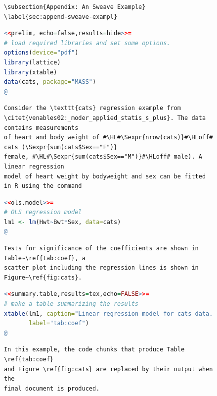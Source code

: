 \documentclass[11pt,article,oneside]{memoir}
\begin{document}
\begin{figure}
\begin{lstlisting}[style=sweave-top]

\end{lstlisting} 
\begin{lstlisting}[language={[latex]tex},numbers=none,style=sweave-tex]   
\subsection{Appendix: An Sweave Example}
\label{sec:append-sweave-exampl}
\end{lstlisting}
\begin{lstlisting}[language=R,numbers=none,style=sweave-r] 
<<prelim, echo=false,results=hide>>=
# load required libraries and set some options.
options(device="pdf")
library(lattice)
library(xtable)
data(cats, package="MASS")
@ 
\end{lstlisting}
\begin{lstlisting}[language={[latex]tex},numbers=none,style=sweave-tex] 
Consider the \texttt{cats} regression example from 
\citet{venables02:_moder_applied_statis_s_plus}. The data contains measurements 
of heart and body weight of #\HL#\Sexpr{nrow(cats)}#\HLoff# cats (\Sexpr{sum(cats$Sex=="F")}
female, #\HL#\Sexpr{sum(cats$Sex=="M")}#\HLoff# male). A linear regression
model of heart weight by bodyweight and sex can be fitted in R using the command
\end{lstlisting} 
\begin{lstlisting}[language=R,numbers=none,style=sweave-r] 
<<ols.model>>=
# OLS regression model 
lm1 <- lm(Hwt~Bwt*Sex, data=cats)
@ 
\end{lstlisting}
\begin{lstlisting}[language={[latex]tex},numbers=none,style=sweave-tex] 
Tests for significance of the coefficients are shown in Table~\ref{tab:coef}, a 
scatter plot including the regression lines is shown in Figure~\ref{fig:cats}.
\end{lstlisting}

\begin{lstlisting}[language=R,numbers=none,style=sweave-r] 
<<summary.table,results=tex,echo=FALSE>>=
# make a table summarizing the results
xtable(lm1, caption="Linear regression model for cats data.", 
       label="tab:coef")
@ 
\end{lstlisting}
\begin{lstlisting}[language={[latex]tex},numbers=none,style=sweave-tex] 
In this example, the code chunks that produce Table \ref{tab:coef} 
and Figure \ref{fig:cats} are replaced by their output when the 
final document is produced. 


\end{lstlisting}
\end{figure}
\end{document}
